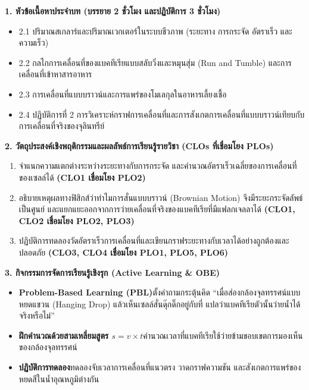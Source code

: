 \cleardoublepage
{}
\begin{planbox}
\noindent\textbf{1. หัวข้อเนื้อหาประจำบท (บรรยาย 2 ชั่วโมง และปฏิบัติการ 3 ชั่วโมง)}
\begin{itemize}
    \item 2.1 ปริมาณสเกลาร์และปริมาณเวกเตอร์ในระบบชีวภาพ (ระยะทาง การกระจัด อัตราเร็ว และความเร็ว)
    \item 2.2 กลไกการเคลื่อนที่ของแบคทีเรียแบบสลับวิ่งและหมุนสุ่ม (Run and Tumble) และการเคลื่อนที่เข้าหาสารอาหาร
    \item 2.3 การเคลื่อนที่แบบบราวน์และการแพร่ของโมเลกุลในอาหารเลี้ยงเชื้อ
    \item 2.4 ปฏิบัติการที่ 2 การวิเคราะห์กราฟการเคลื่อนที่และการสังเกตการเคลื่อนที่แบบบราวน์เทียบกับการเคลื่อนที่จริงของจุลินทรีย์
\end{itemize}

\noindent\textbf{2. วัตถุประสงค์เชิงพฤติกรรมและผลลัพธ์การเรียนรู้รายวิชา (CLOs ที่เชื่อมโยง PLOs)}
\begin{enumerate}
    \item จำแนกความแตกต่างระหว่างระยะทางกับการกระจัด และคำนวณอัตราเร็วเฉลี่ยของการเคลื่อนที่ของเซลล์ได้ \textbf{(CLO1 เชื่อมโยง PLO2)}
    \item อธิบายเหตุผลทางฟิสิกส์ว่าทำไมการสั่นแบบบราวน์ (Brownian Motion) จึงมีระยะกระจัดลัพธ์เป็นศูนย์ และแยกแยะออกจากการว่ายเคลื่อนที่จริงของแบคทีเรียที่มีแฟลกเจลลาได้ \textbf{(CLO1, CLO2 เชื่อมโยง PLO2, PLO3)}
    \item ปฏิบัติการทดลองวัดอัตราเร็วการเคลื่อนที่และเขียนกราฟระยะทางกับเวลาได้อย่างถูกต้องและปลอดภัย \textbf{(CLO3, CLO4 เชื่อมโยง PLO1, PLO5, PLO6)}
\end{enumerate}

\noindent\textbf{3. กิจกรรมการจัดการเรียนรู้เชิงรุก (Active Learning \& OBE)}
\begin{itemize}
    \item \textbf{Problem-Based Learning (PBL)}\quad ตั้งคำถามกระตุ้นคิด ``เมื่อส่องกล้องจุลทรรศน์แบบหยดแขวน (Hanging Drop) แล้วเห็นเซลล์สั่นดุ๊กดิ๊กอยู่กับที่ แปลว่าแบคทีเรียตัวนั้นว่ายน้ำได้จริงหรือไม่''
    \item \textbf{ฝึกคำนวณด้วยสามเหลี่ยมสูตร $s = v \times t$}\quad คำนวณเวลาที่แบคทีเรียใช้ว่ายข้ามขอบเขตการมองเห็นของกล้องจุลทรรศน์
    \item \textbf{ปฏิบัติการทดลอง}\quad ทดลองจับเวลาการเคลื่อนที่แนวตรง วาดกราฟความชัน และสังเกตการแพร่ของหยดสีในน้ำอุณหภูมิต่างกัน
\end{itemize}


\end{planbox}
